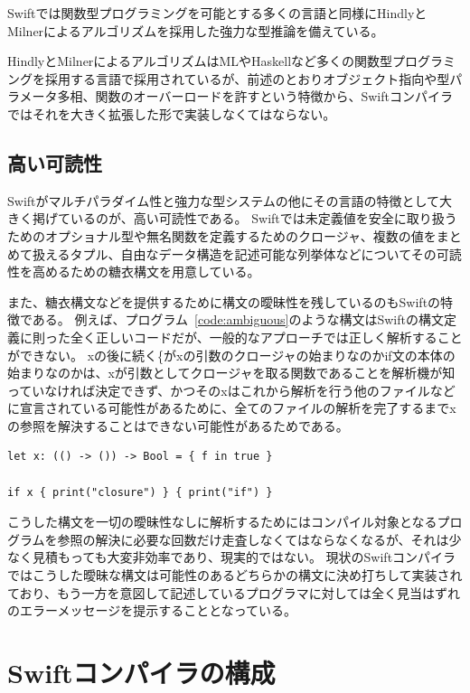 Swiftでは関数型プログラミングを可能とする多くの言語と同様にHindlyとMilnerによるアルゴリズムを採用した強力な型推論を備えている。

HindlyとMilnerによるアルゴリズムはMLやHaskellなど多くの関数型プログラミングを採用する言語で採用されているが、前述のとおりオブジェクト指向や型パラメータ多相、関数のオーバーロードを許すという特徴から、Swiftコンパイラではそれを大きく拡張した形で実装しなくてはならない。


\subsection{高い可読性}
\label{explain-swift:features:readability}

Swiftがマルチパラダイム性と強力な型システムの他にその言語の特徴として大きく掲げているのが、高い可読性である。
Swiftでは未定義値を安全に取り扱うためのオプショナル型や無名関数を定義するためのクロージャ、複数の値をまとめて扱えるタプル、自由なデータ構造を記述可能な列挙体などについてその可読性を高めるための糖衣構文を用意している。

また、糖衣構文などを提供するために構文の曖昧性を残しているのもSwiftの特徴である。
例えば、プログラム~\ref{code:ambiguous}のような構文はSwiftの構文定義に則った全く正しいコードだが、一般的なアプローチでは正しく解析することができない。
xの後に続く\{がxの引数のクロージャの始まりなのかif文の本体の始まりなのかは、xが引数としてクロージャを取る関数であることを解析機が知っていなければ決定できず、かつそのxはこれから解析を行う他のファイルなどに宣言されている可能性があるために、全てのファイルの解析を完了するまでxの参照を解決することはできない可能性があるためである。

\begin{lstlisting}[caption=曖昧な構文を持った正しいSwiftコード, label=code:ambiguous]
let x: (() -> ()) -> Bool = { f in true }

if x { print("closure") } { print("if") }
\end{lstlisting}

こうした構文を一切の曖昧性なしに解析するためにはコンパイル対象となるプログラムを参照の解決に必要な回数だけ走査しなくてはならなくなるが、それは少なく見積もっても大変非効率であり、現実的ではない。
現状のSwiftコンパイラではこうした曖昧な構文は可能性のあるどちらかの構文に決め打ちして実装されており、もう一方を意図して記述しているプログラマに対しては全く見当はずれのエラーメッセージを提示することとなっている。


\section{Swiftコンパイラの構成}
\label{explain-swift:structure}

